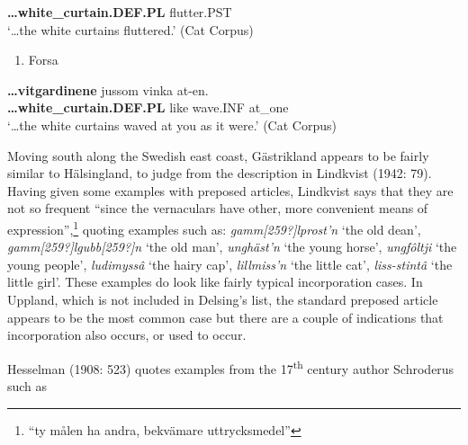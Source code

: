 \textbf{…white\_curtain.DEF.PL} flutter.PST\\ %


‘…the white curtains fluttered.’ (Cat Corpus)
\z


\begin{enumerate} %
\item 
Forsa

\end{enumerate} %
\ea\label{}
\gll \textbf{…vitgardinene} jussom  vinka  at-en.\\


\textbf{…white\_curtain.DEF.PL} like  wave.INF  at\_one\\ %


‘…the white curtains waved at you as it were.’ (Cat Corpus)
\z


Moving south along the Swedish east coast, Gästrikland appears to be fairly similar to Hälsingland, to judge from the description in Lindkvist (1942: 79).  Having given some examples with preposed articles, Lindkvist says that they are not so frequent “since the vernaculars have other, more convenient means of expression”,\footnote{ “ty målen ha andra, bekvämare uttrycksmedel”} quoting examples such as: \textit{gamm[259?]lprost’n} ‘the old dean’, \textit{gamm[259?]lgubb[259?]n} ‘the old man’, \textit{unghäst’n} ‘the young horse’, \textit{ungfôltji} ‘the young people’, \textit{ludimyssâ} ‘the hairy cap’, \textit{lillmiss’n} ‘the little cat’, \textit{liss-stintâ} ‘the little girl’. These examples do look like fairly typical incorporation cases.  In Uppland, which is not included in Delsing’s list, the standard preposed article appears to be the most common case but there are a couple of indications that incorporation also occurs, or used to occur.

Hesselman (1908: 523) quotes examples from the 17\textsuperscript{th} century author Schroderus such as


